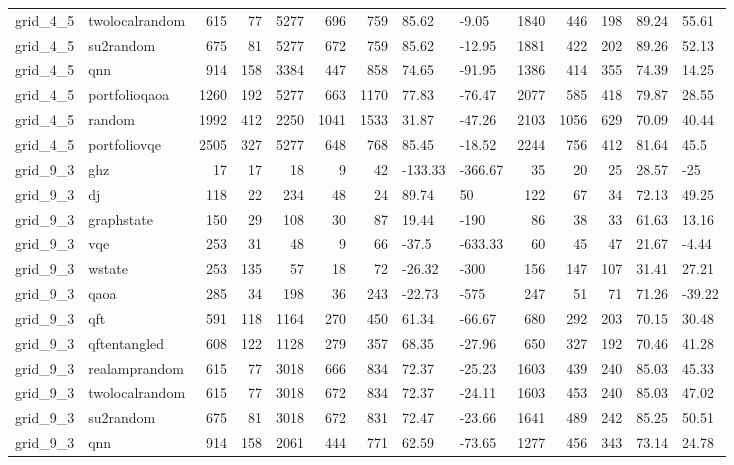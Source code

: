 \begin{longtable}{llrrrrrllrrrll}
grid\_4\_5 & twolocalrandom & 615 & 77 & 5277 & 696 & 759 & 85.62 & -9.05 & 1840 & 446 & 198 & 89.24 & 55.61 \\
grid\_4\_5 & su2random & 675 & 81 & 5277 & 672 & 759 & 85.62 & -12.95 & 1881 & 422 & 202 & 89.26 & 52.13 \\
grid\_4\_5 & qnn & 914 & 158 & 3384 & 447 & 858 & 74.65 & -91.95 & 1386 & 414 & 355 & 74.39 & 14.25 \\
grid\_4\_5 & portfolioqaoa & 1260 & 192 & 5277 & 663 & 1170 & 77.83 & -76.47 & 2077 & 585 & 418 & 79.87 & 28.55 \\
grid\_4\_5 & random & 1992 & 412 & 2250 & 1041 & 1533 & 31.87 & -47.26 & 2103 & 1056 & 629 & 70.09 & 40.44 \\
grid\_4\_5 & portfoliovqe & 2505 & 327 & 5277 & 648 & 768 & 85.45 & -18.52 & 2244 & 756 & 412 & 81.64 & 45.5 \\
grid\_9\_3 & ghz & 17 & 17 & 18 & 9 & 42 & -133.33 & -366.67 & 35 & 20 & 25 & 28.57 & -25 \\
grid\_9\_3 & dj & 118 & 22 & 234 & 48 & 24 & 89.74 & 50 & 122 & 67 & 34 & 72.13 & 49.25 \\
grid\_9\_3 & graphstate & 150 & 29 & 108 & 30 & 87 & 19.44 & -190 & 86 & 38 & 33 & 61.63 & 13.16 \\
grid\_9\_3 & vqe & 253 & 31 & 48 & 9 & 66 & -37.5 & -633.33 & 60 & 45 & 47 & 21.67 & -4.44 \\
grid\_9\_3 & wstate & 253 & 135 & 57 & 18 & 72 & -26.32 & -300 & 156 & 147 & 107 & 31.41 & 27.21 \\
grid\_9\_3 & qaoa & 285 & 34 & 198 & 36 & 243 & -22.73 & -575 & 247 & 51 & 71 & 71.26 & -39.22 \\
grid\_9\_3 & qft & 591 & 118 & 1164 & 270 & 450 & 61.34 & -66.67 & 680 & 292 & 203 & 70.15 & 30.48 \\
grid\_9\_3 & qftentangled & 608 & 122 & 1128 & 279 & 357 & 68.35 & -27.96 & 650 & 327 & 192 & 70.46 & 41.28 \\
grid\_9\_3 & realamprandom & 615 & 77 & 3018 & 666 & 834 & 72.37 & -25.23 & 1603 & 439 & 240 & 85.03 & 45.33 \\
grid\_9\_3 & twolocalrandom & 615 & 77 & 3018 & 672 & 834 & 72.37 & -24.11 & 1603 & 453 & 240 & 85.03 & 47.02 \\
grid\_9\_3 & su2random & 675 & 81 & 3018 & 672 & 831 & 72.47 & -23.66 & 1641 & 489 & 242 & 85.25 & 50.51 \\
grid\_9\_3 & qnn & 914 & 158 & 2061 & 444 & 771 & 62.59 & -73.65 & 1277 & 456 & 343 & 73.14 & 24.78 \\

\end{longtable}
